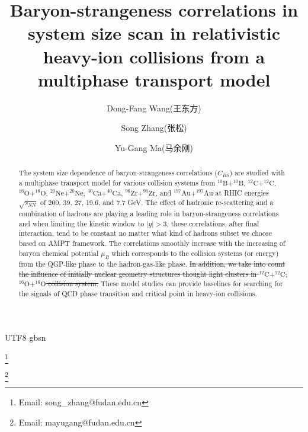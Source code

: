 \documentclass[twocolumn,showpacs,preprintnumbers,superscriptaddress,amsmath,amssymb]{revtex4}
\begin{document}
\begin{CJK*} {UTF8} {gbsn}

\title{Baryon-strangeness correlations in system size scan in relativistic heavy-ion collisions from a multiphase transport model}

\author{Dong-Fang Wang(王东方)}



\author{Song Zhang(张松)}\thanks{Email: song\_zhang@fudan.edu.cn}

\author{Yu-Gang Ma(马余刚)}\thanks{Email:  mayugang@fudan.edu.cn}


\begin{abstract}
The system size dependence of baryon-strangeness correlations ($C_{BS}$) are studied with a multiphase transport model for various collision systems from 
$\mathrm{^{10}B+^{10}B}$, $\mathrm{^{12}C+^{12}C}$, $\mathrm{^{16}O+^{16}O}$, $\mathrm{^{20}Ne+^{20}Ne}$, $\mathrm{^{40}Ca+^{40}Ca}$, $\mathrm{^{96}Zr+^{96}Zr}$, and $\mathrm{^{197}Au+^{197}Au}$ at RHIC energies $\sqrt{s_{NN}}$ of 200, 39, 27, 19.6, and 7.7 GeV.
The effect of hadronic re-scattering and a combination of hadrons are playing a leading role in baryon-strangeness correlations and 
when limiting the kinetic window to $|y|>3$, these correlations, after final interaction, tend to be constant no matter what kind of hadrons subset we choose based on AMPT framework. The correlations smoothly increase with the increasing of baryon chemical potential $\mu_B$ which corresponds to the collision systems (or energy) from the QGP-like phase to the hadron-gas-like phase.
{\sout {In addition, we take into count the influence of initially nuclear geometry structures thought light clusters in $\mathrm{^{12}C+^{12}C}$, $\mathrm{^{16}O+^{16}O}$ collision system. }}
These model studies can provide baselines for searching for the signals of QCD phase transition and critical point in heavy-ion collisions.
 	\end{abstract}
\maketitle




\end{CJK*}
\end{document}
